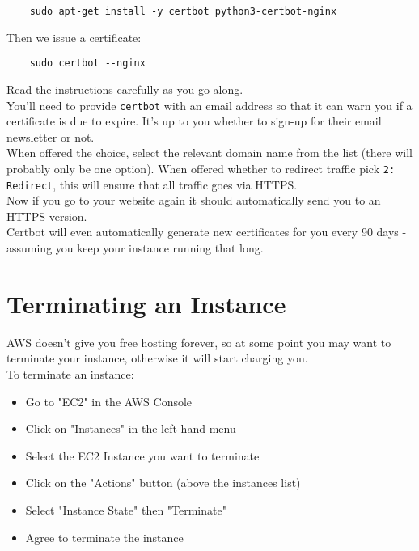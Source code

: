 \begin{verbatim}
    sudo apt-get install -y certbot python3-certbot-nginx
\end{verbatim}

Then we issue a certificate:

\begin{verbatim}
    sudo certbot --nginx
\end{verbatim}

Read the instructions carefully as you go along.
\\

You'll need to provide \texttt{certbot} with an email address so that it can warn you if a certificate is due to expire. It's up to you whether to sign-up for their email newsletter or not.
\\

When offered the choice, select the relevant domain name from the list (there will probably only be one option). When offered whether to redirect traffic pick \texttt{2: Redirect}, this will ensure that all traffic goes via HTTPS.
\\

Now if you go to your website again it should automatically send you to an HTTPS version.
\\

Certbot will even automatically generate new certificates for you every 90 days - assuming you keep your instance running that long.


\section{Terminating an Instance}

AWS doesn't give you free hosting forever, so at some point you may want to terminate your instance, otherwise it will start charging you.
\\

To terminate an instance:

\begin{itemize}
    \item Go to "EC2" in the AWS Console
    \item Click on "Instances" in the left-hand menu
    \item Select the EC2 Instance you want to terminate
    \item Click on the "Actions" button (above the instances list)
    \item Select "Instance State" then "Terminate"
    \item Agree to terminate the instance
\end{itemize}

